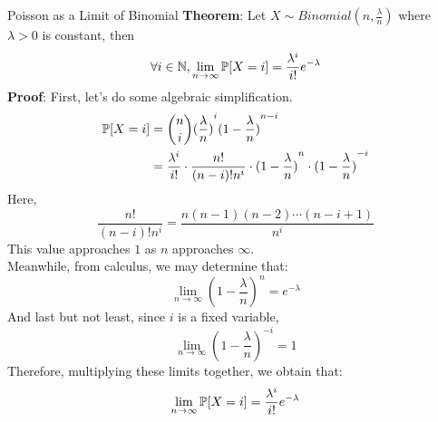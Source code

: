 \begin{ln-theorem}{Poisson as a Limit of Binomial}{}
    \textbf{Theorem}: Let $X \sim Binomial(n, \frac{\lambda}{n})$ where $\lambda > 0$ is constant, then
    \[\forall i \in \N, \lim_{n \rightarrow \infty}\P[X = i] = \frac{\lambda^i}{i!}e^{-\lambda}\]
    \tcblower
    \textbf{Proof}:
    First, let's do some algebraic simplification.
    \begin{align*}
        \P[X = i]
        &= \binom{n}{i} {(\frac{\lambda}{n})}^i {(1 - \frac{\lambda}{n})}^{n - i} \\
        &= \frac{\lambda^i}{i!} \cdot \frac{n!}{(n - i)! n^i} \cdot {(1 - \frac{\lambda}{n})}^{n} \cdot {(1 - \frac{\lambda}{n})}^{-i}
    \end{align*}
    Here,
    \[\frac{n!}{(n - i)! n^i} = \frac{n (n - 1) (n - 2) \cdots (n - i + 1)}{n^i}\]
    This value approaches $1$ as $n$ approaches $\infty$. \\
    Meanwhile, from calculus, we may determine that:
    \[\lim_{n \rightarrow \infty} {(1 - \frac{\lambda}{n})}^n = e^{-\lambda}\]
    And last but not least, since $i$ is a fixed variable,
    \[\lim_{n \rightarrow \infty} {(1 - \frac{\lambda}{n})}^{-i} = 1\]
    Therefore, multiplying these limits together, we obtain that:
    \[\lim_{n \rightarrow \infty} \P[X = i] = \frac{\lambda^i}{i!}e^{-\lambda}\]
\end{ln-theorem}
